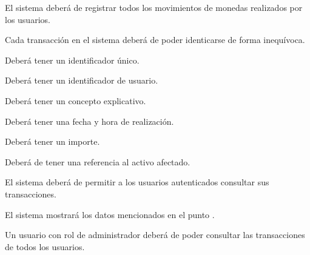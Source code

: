 

\begin{RFTransacciones}
	\item El sistema deberá de registrar todos los movimientos de monedas realizados por los usuarios.
	\item Cada transacción en el sistema deberá de poder identicarse de forma inequívoca. \hypertarget{RT-2}{}
	\begin{RFTransacciones}
		\item Deberá tener un identificador único.
		\item Deberá tener un identificador de usuario.
		\item Deberá tener un concepto explicativo.
		\item Deberá tener una fecha y hora de realización.
		\item Deberá tener un importe.
		\item Deberá de tener una referencia al activo afectado.
	\end{RFTransacciones}
	\item El sistema deberá de permitir a los usuarios autenticados consultar sus transacciones.
	\begin{RFTransacciones}
		\item El sistema mostrará los datos mencionados en el punto .
	\end{RFTransacciones}
	\item Un usuario con rol de administrador deberá de poder consultar las transacciones de todos los usuarios.	
\end{RFTransacciones}